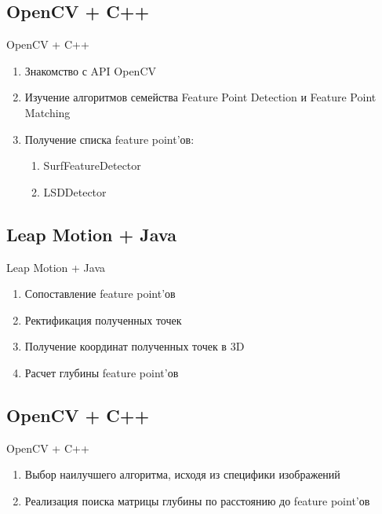 \documentclass{beamer}
\begin{document}
\subsection{OpenCV + C++}
\begin{frame}[t]{OpenCV + C++}
	\begin{enumerate}
	\item Знакомство с API OpenCV
	\item Изучение алгоритмов семейства Feature Point Detection и Feature Point Matching
	\item
		Получение списка feature point’ов:
		\begin{enumerate}
			\item SurfFeatureDetector
			\item LSDDetector
		\end{enumerate}
	\end{enumerate}
\end{frame}

\subsection{Leap Motion + Java}
\begin{frame}[t]{Leap Motion + Java}
	\begin{enumerate}
		\item Сопоставление feature point’ов
		\item Ректификация полученных точек
		\item Получение координат полученных точек в 3D
		\item Расчет глубины feature point’ов
	\end{enumerate}
\end{frame}

\subsection{OpenCV + C++}
\begin{frame}[t]{OpenCV + C++}
	\begin{enumerate}
	\item Выбор наилучшего алгоритма, исходя из специфики изображений
	\item Реализация поиска матрицы глубины по расстоянию до feature point’ов
	\end{enumerate}
\end{frame}
\end{document}
